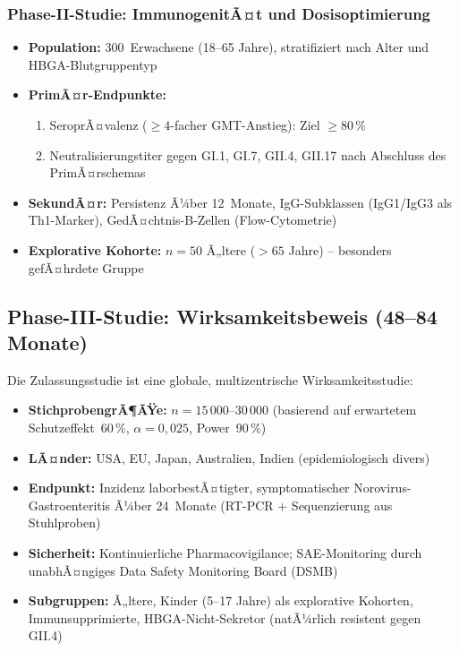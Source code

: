 ﻿\documentclass[a4paper,12pt]{article}
\theoremstyle{plain}
\theoremstyle{definition}
\theoremstyle{remark}
\begin{document}
\subsubsection{Phase-II-Studie: ImmunogenitÃ¤t und Dosisoptimierung}

\begin{itemize}
  \item \textbf{Population:} 300~Erwachsene (18--65 Jahre), stratifiziert nach Alter
        und HBGA-Blutgruppentyp
  \item \textbf{PrimÃ¤r-Endpunkte:}
        \begin{enumerate}
          \item SeroprÃ¤valenz ($\geq\!4$-facher GMT-Anstieg): Ziel $\geq80\,\%$
          \item Neutralisierungstiter gegen GI.1, GI.7, GII.4, GII.17 nach Abschluss
                des PrimÃ¤rschemas
        \end{enumerate}
  \item \textbf{SekundÃ¤r:} Persistenz Ã¼ber 12~Monate, IgG-Subklassen (IgG1/IgG3
        als Th1-Marker), GedÃ¤chtnis-B-Zellen (Flow-Cytometrie)
  \item \textbf{Explorative Kohorte:} $n=50$ Ã„ltere ($>65$ Jahre) -- besonders
        gefÃ¤hrdete Gruppe
\end{itemize}

\subsection{Phase-III-Studie: Wirksamkeitsbeweis (48--84 Monate)}

Die Zulassungsstudie ist eine globale, multizentrische Wirksamkeitsstudie:

\begin{itemize}
  \item \textbf{StichprobengrÃ¶ÃŸe:} $n=15\,000$--$30\,000$ (basierend auf erwartetem
        Schutzeffekt~60\,\%, $\alpha=0{,}025$, Power~90\,\%)
  \item \textbf{LÃ¤nder:} USA, EU, Japan, Australien, Indien (epidemiologisch divers)
  \item \textbf{Endpunkt:} Inzidenz laborbestÃ¤tigter, symptomatischer Norovirus-
        Gastroenteritis Ã¼ber 24~Monate (RT-PCR + Sequenzierung aus Stuhlproben)
  \item \textbf{Sicherheit:} Kontinuierliche Pharmacovigilance; SAE-Monitoring
        durch unabhÃ¤ngiges Data Safety Monitoring Board (DSMB)
  \item \textbf{Subgruppen:} Ã„ltere, Kinder (5--17 Jahre) als explorative Kohorten,
        Immunsupprimierte, HBGA-Nicht-Sekretor (natÃ¼rlich resistent gegen GII.4)
\end{itemize}
\end{document}
